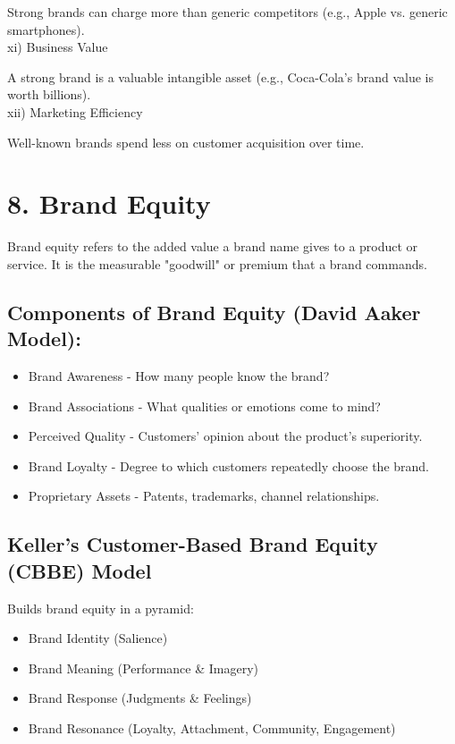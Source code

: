 \documentclass[10pt]{article}
\begin{document}
Strong brands can charge more than generic competitors (e.g., Apple vs. generic smartphones).\\
xi) Business Value

A strong brand is a valuable intangible asset (e.g., Coca-Cola's brand value is worth billions).\\
xii) Marketing Efficiency

Well-known brands spend less on customer acquisition over time.

\section*{8. Brand Equity}
Brand equity refers to the added value a brand name gives to a product or service. It is the measurable "goodwill" or premium that a brand commands.

\subsection*{Components of Brand Equity (David Aaker Model):}
\begin{itemize}
  \item Brand Awareness - How many people know the brand?
  \item Brand Associations - What qualities or emotions come to mind?
  \item Perceived Quality - Customers' opinion about the product's superiority.
  \item Brand Loyalty - Degree to which customers repeatedly choose the brand.
  \item Proprietary Assets - Patents, trademarks, channel relationships.
\end{itemize}

\subsection*{Keller's Customer-Based Brand Equity (CBBE) Model}
Builds brand equity in a pyramid:

\begin{itemize}
  \item Brand Identity (Salience)
  \item Brand Meaning (Performance \& Imagery)
  \item Brand Response (Judgments \& Feelings)
  \item Brand Resonance (Loyalty, Attachment, Community, Engagement)
\end{itemize}
\end{document}
